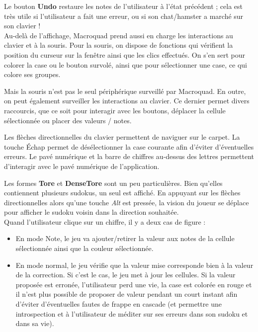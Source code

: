 \documentclass[a4paper]{article}
\begin{document}
\begin{justify}
    Le bouton \textbf{Undo} restaure les notes de l'utilisateur à l'état précédent ; cela est très utile si l'utilisateur a fait une erreur, ou si son chat/hamster a marché sur son clavier ! \\
    
    Au-delà de l'affichage, Macroquad prend aussi en charge les interactions au clavier et à la souris. Pour la souris, on dispose de fonctions qui vérifient la position du curseur sur la fenêtre ainsi que les clics effectués. On s'en sert pour colorer la case ou le bouton survolé, ainsi que pour sélectionner une case, ce qui colore ses groupes.
    
    Mais la souris n'est pas le seul périphérique surveillé par Macroquad. En outre, on peut également surveiller les interactions au clavier. Ce dernier permet divers raccourcis, que ce soit pour interagir avec les boutons, déplacer la cellule sélectionnée ou placer des valeurs / notes.
    
    Les flèches directionnelles du clavier permettent de naviguer sur le carpet. La touche Échap permet de désélectionner la case courante afin d'éviter d'éventuelles erreurs. Le pavé numérique et la barre de chiffres au-dessus des lettres permettent d'interagir avec le pavé numérique de l'application.

    Les formes \textbf{Tore} et \textbf{DenseTore} sont un peu particulières. Bien qu'elles contiennent plusieurs sudokus, un seul est affiché. En appuyant sur les flèches directionnelles alors qu'une touche \textit{Alt} est pressée, la vision du joueur se déplace pour afficher le sudoku voisin dans la direction souhaitée. \\
    
    \noindent Quand l'utilisateur clique sur un chiffre, il y a deux cas de figure :
    \begin{itemize}
        \item En mode Note, le jeu va ajouter/retirer la valeur aux notes de la cellule sélectionnée ainsi que la couleur sélectionnée.
        
        \item En mode normal, le jeu vérifie que la valeur mise corresponde bien à la valeur de la correction. Si c'est le cas, le jeu met à jour les cellules. Si la valeur proposée est erronée, l'utilisateur perd une vie, la case est colorée en rouge et il n'est plus possible de proposer de valeur pendant un court instant afin d'éviter d'éventuelles fautes de frappe en cascade (et permettre une introspection et à l'utilisateur de méditer sur ses erreurs dans son sudoku et dans sa vie).
    \end{itemize}    
\end{justify}
\end{document}
